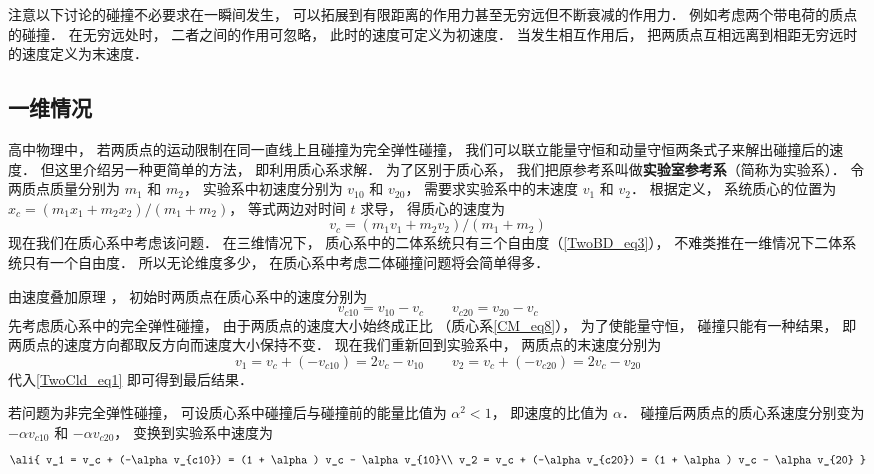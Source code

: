 

注意以下讨论的碰撞不必要求在一瞬间发生， 可以拓展到有限距离的作用力甚至无穷远但不断衰减的作用力． 例如考虑两个带电荷的质点的碰撞． 在无穷远处时， 二者之间的作用可忽略， 此时的速度可定义为初速度． 当发生相互作用后， 把两质点互相远离到相距无穷远时的速度定义为末速度．

\subsection{一维情况}
高中物理中， 若两质点的运动限制在同一直线上且碰撞为完全弹性碰撞， 我们可以联立能量守恒和动量守恒两条式子来解出碰撞后的速度． 但这里介绍另一种更简单的方法， 即利用质心系求解． 为了区别于质心系， 我们把原参考系叫做\textbf{实验室参考系}（简称为实验系）． 令两质点质量分别为 $m_1$ 和 $m_2$， 实验系中初速度分别为 $v_{10}$ 和 $v_{20}$， 需要求实验系中的末速度 $v_1$ 和 $v_2$． 根据定义， 系统质心的位置为 $x_c = (m_1 x_1 + m_2 x_2)/(m_1 + m_2)$， 等式两边对时间 $t$ 求导， 得质心的速度为
\begin{equation}\label{TwoCld_eq1}
v_c = (m_1 v_1 + m_2 v_2)/(m_1 + m_2)
\end{equation}
现在我们在质心系中考虑该问题． 在三维情况下， 质心系中的二体系统只有三个自由度（\autoref{TwoBD_eq3}）， 不难类推在一维情况下二体系统只有一个自由度． 所以无论维度多少， 在质心系中考虑二体碰撞问题将会简单得多． 

由速度叠加原理%
， 初始时两质点在质心系中的速度分别为
\begin{equation}
v_{c10} = v_{10} - v_c \qquad v_{c20} = v_{20} - v_c
\end{equation}
先考虑质心系中的完全弹性碰撞， 由于两质点的速度大小始终成正比 （质心系\autoref{CM_eq8}）， 为了使能量守恒， 碰撞只能有一种结果， 即两质点的速度方向都取反方向而速度大小保持不变． 现在我们重新回到实验系中， 两质点的末速度分别为
\begin{equation}
v_1 = v_c + (-v_{c10}) = 2v_c - v_{10}  \qquad v_2 = v_c + (-v_{c20}) = 2v_c - v_{20}
\end{equation}
代入\autoref{TwoCld_eq1} 即可得到最后结果．

若问题为非完全弹性碰撞， 可设质心系中碰撞后与碰撞前的能量比值为 $\alpha^2 < 1$， 即速度的比值为 $\alpha$． 碰撞后两质点的质心系速度分别变为 $-\alpha v_{c10}$ 和 $-\alpha v_{c20}$， 变换到实验系中速度为
\begin{equation}\ali{
v_1 = v_c + (-\alpha v_{c10}) = (1 + \alpha) v_c - \alpha v_{10}\\
v_2 = v_c + (-\alpha v_{c20}) = (1 + \alpha) v_c - \alpha v_{20}
}\end{equation}

